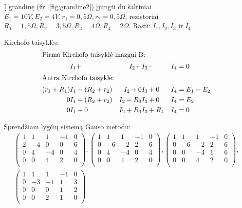 \begin{exmp}

  Į grandinę (žr. \ref{fig:grandine2}) įjungti du šaltiniai $E_{1} =
  10V, E_{2} = 4V, r_{1} = 0,5 \Omega, r_{2} = 0,5 \Omega$, rezistoriai
  $R_{1} = 1,5 \Omega, R_{2} = 3,5 \Omega, R_{3} = 4 \Omega,
  R_{4} = 2 \Omega$. Rasti: $I_{1}, I_{2}, I_{3}$ ir $I_{4}$.

  Kirchofo taisyklės:
  \begin{align*}
    \intertext{Pirma Kirchofo taisyklė mazgui B:}
    \,                &I_{1} + \,               &I_{2} + \,     &I_{3} - \,     &I_{4} &= 0 \\
    \intertext{Antra Kirchofo taisyklė:}
    (r_{1} + R_{1})   &I_{1} - (R_{2} + r_{2})  &I_{2} + 0      &I_{3} + 0      &I_{4} &= E_{1} - E_{2} \\
    0                 &I_{1} + (R_{2} + r_{2})  &I_{2} - R_{3}  &I_{3} + 0      &I_{4} &= E_{2} \\
    0                 &I_{1} + 0                &I_{2} + R_{3}  &I_{3} + R_{4}  &I_{4} &= 0 \\
  \end{align*}

  Sprendžiam lygčių sistemą Gauso metodu:
  \begin{align*}
    \begin{pmatrix}
      1 & 1 & 1 & -1 & 0 \\
      2 & -4 & 0 & 0 & 6 \\
      0 & 4 & -4 & 0 & 4 \\
      0 & 0 & 4 & 2 & 0 \\
    \end{pmatrix},
    \begin{pmatrix}
      1 & 1 & 1 & -1 & 0 \\
      0 & -6 & -2 & 2 & 6 \\
      0 & 4 & -4 & 0 & 4 \\
      0 & 0 & 4 & 2 & 0 \\
    \end{pmatrix},
    \begin{pmatrix}
      1 & 1 & 1 & -1 & 0 \\
      0 & -6 & -2 & 2 & 6 \\
      0 & 0 & -4 & 1 & 6 \\
      0 & 0 & 4 & 2 & 0 \\
    \end{pmatrix},\\
    \begin{pmatrix}
      1 & 1 & 1 & -1 & 0 \\
      0 & -3 & -1 & 1 & 3 \\
      0 & 0 & 0 & 1 & 2 \\
      0 & 0 & 2 & 1 & 0 \\
    \end{pmatrix}
  \end{align*}


\end{exmp}
